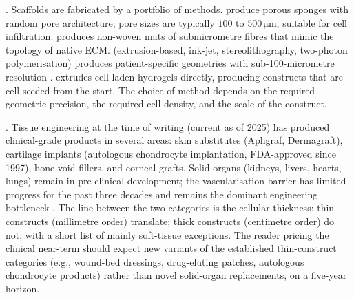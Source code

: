 

. Scaffolds are fabricated by a portfolio
of methods.  produce porous
sponges with random pore architecture; pore sizes are typically
$100$ to $500\,\si{\micro\meter}$, suitable for cell infiltration.
 produces non-woven mats of submicrometre
fibres that mimic the topology of native ECM. 
(extrusion-based, ink-jet, stereolithography, two-photon polymerisation)
produces patient-specific geometries with sub-100-micrometre resolution
\cite{paper:v6c05-billiet-3d-printing-2012}. 
extrudes cell-laden hydrogels directly, producing constructs that are
cell-seeded from the start. The choice of method depends on the
required geometric precision, the required cell density, and the
scale of the construct.

. Tissue engineering at the time of
writing (current as of 2025) has produced clinical-grade products in
several areas: skin substitutes (Apligraf, Dermagraft), cartilage
implants (autologous chondrocyte implantation, FDA-approved since
1997), bone-void fillers, and corneal grafts. Solid organs (kidneys,
livers, hearts, lungs) remain in pre-clinical development; the
vascularisation barrier has limited progress for the past three
decades and remains the dominant engineering bottleneck
\cite[ch.~30]{text:v6c05-langer-vacanti-tissue-2014,
paper:v6c05-griffith-naughton-2002}. The line between the two
categories is the cellular thickness: thin constructs (millimetre
order) translate; thick constructs (centimetre order) do not, with a
short list of mainly soft-tissue exceptions. The reader pricing the
clinical near-term should expect new variants of the established
thin-construct categories (e.g., wound-bed dressings, drug-eluting
patches, autologous chondrocyte products) rather than novel
solid-organ replacements, on a five-year horizon.

